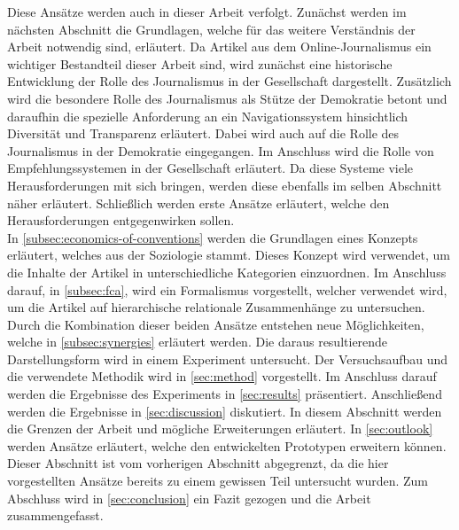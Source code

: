 Diese Ansätze werden auch in dieser Arbeit verfolgt.
Zunächst werden im nächsten Abschnitt die Grundlagen, welche für das weitere Verständnis der Arbeit notwendig sind, erläutert.
Da Artikel aus dem Online-Journalismus ein wichtiger Bestandteil dieser Arbeit sind, wird zunächst eine historische Entwicklung der Rolle des Journalismus in der Gesellschaft dargestellt.
Zusätzlich wird die besondere Rolle des Journalismus als Stütze der Demokratie betont und daraufhin die spezielle Anforderung an ein Navigationssystem hinsichtlich Diversität und Transparenz erläutert.
Dabei wird auch auf die Rolle des Journalismus in der Demokratie eingegangen.
Im Anschluss wird die Rolle von Empfehlungssystemen in der Gesellschaft erläutert.
Da diese Systeme viele Herausforderungen mit sich bringen, werden diese ebenfalls im selben Abschnitt näher erläutert.
Schließlich werden erste Ansätze erläutert, welche den Herausforderungen entgegenwirken sollen. \\

In \autoref{subsec:economics-of-conventions} werden die Grundlagen eines Konzepts erläutert, welches aus der Soziologie stammt.
Dieses Konzept wird verwendet, um die Inhalte der Artikel in unterschiedliche Kategorien einzuordnen.
Im Anschluss darauf, in \autoref{subsec:fca}, wird ein Formalismus vorgestellt, welcher verwendet wird, um die Artikel auf hierarchische relationale Zusammenhänge zu untersuchen.
Durch die Kombination dieser beiden Ansätze entstehen neue Möglichkeiten, welche in \autoref{subsec:synergies} erläutert werden.
Die daraus resultierende Darstellungsform wird in einem Experiment untersucht.
Der Versuchsaufbau und die verwendete Methodik wird in \autoref{sec:method} vorgestellt.
Im Anschluss darauf werden die Ergebnisse des Experiments in \autoref{sec:results} präsentiert.
Anschließend werden die Ergebnisse in \autoref{sec:discussion} diskutiert.
In diesem Abschnitt werden die Grenzen der Arbeit und mögliche Erweiterungen erläutert.
In \autoref{sec:outlook} werden Ansätze erläutert, welche den entwickelten Prototypen erweitern können.
Dieser Abschnitt ist vom vorherigen Abschnitt abgegrenzt, da die hier vorgestellten Ansätze bereits zu einem gewissen Teil untersucht wurden.
Zum Abschluss wird in \autoref{sec:conclusion} ein Fazit gezogen und die Arbeit zusammengefasst.
